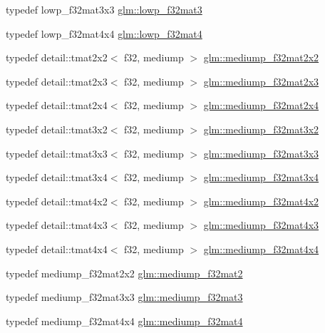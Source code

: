 \begin{DoxyCompactItemize}
\item 
typedef lowp\+\_\+f32mat3x3 \hyperlink{group__gtc__type__precision_ga84500ab23c0f0f3c585f8ad02f33b88c}{glm\+::lowp\+\_\+f32mat3}
\item 
typedef lowp\+\_\+f32mat4x4 \hyperlink{group__gtc__type__precision_gada4d11f44b410c1be7b6b1d05ccf692c}{glm\+::lowp\+\_\+f32mat4}
\item 
typedef detail\+::tmat2x2$<$ f32, mediump $>$ \hyperlink{group__gtc__type__precision_ga23c9239d6aa9b41c3d2145e2faa81edb}{glm\+::mediump\+\_\+f32mat2x2}
\item 
typedef detail\+::tmat2x3$<$ f32, mediump $>$ \hyperlink{group__gtc__type__precision_ga42497d19668931d225bccf1b9c614c19}{glm\+::mediump\+\_\+f32mat2x3}
\item 
typedef detail\+::tmat2x4$<$ f32, mediump $>$ \hyperlink{group__gtc__type__precision_ga20c5b3b715b70f1c09f7f95bfaa7aa84}{glm\+::mediump\+\_\+f32mat2x4}
\item 
typedef detail\+::tmat3x2$<$ f32, mediump $>$ \hyperlink{group__gtc__type__precision_ga9762d48bb9b41e3cf40f6e616cf61b6b}{glm\+::mediump\+\_\+f32mat3x2}
\item 
typedef detail\+::tmat3x3$<$ f32, mediump $>$ \hyperlink{group__gtc__type__precision_gad4d01189a1462366b143c5cbc3de0ea9}{glm\+::mediump\+\_\+f32mat3x3}
\item 
typedef detail\+::tmat3x4$<$ f32, mediump $>$ \hyperlink{group__gtc__type__precision_ga7ad59b967576d930f4c8aa7b8c48e1af}{glm\+::mediump\+\_\+f32mat3x4}
\item 
typedef detail\+::tmat4x2$<$ f32, mediump $>$ \hyperlink{group__gtc__type__precision_ga3400d5463f0a58cf3959406aa2b69f72}{glm\+::mediump\+\_\+f32mat4x2}
\item 
typedef detail\+::tmat4x3$<$ f32, mediump $>$ \hyperlink{group__gtc__type__precision_ga31635d753ab8a19fdaa80d2b89e90c54}{glm\+::mediump\+\_\+f32mat4x3}
\item 
typedef detail\+::tmat4x4$<$ f32, mediump $>$ \hyperlink{group__gtc__type__precision_ga8f83086fffe71f9cd15e75a1de101ba6}{glm\+::mediump\+\_\+f32mat4x4}
\item 
typedef mediump\+\_\+f32mat2x2 \hyperlink{group__gtc__type__precision_ga103735a38477f7c389b36aae0fbdf274}{glm\+::mediump\+\_\+f32mat2}
\item 
typedef mediump\+\_\+f32mat3x3 \hyperlink{group__gtc__type__precision_gae263a08ef179894fdd36f9a51698c4ab}{glm\+::mediump\+\_\+f32mat3}
\item 
typedef mediump\+\_\+f32mat4x4 \hyperlink{group__gtc__type__precision_ga56bd98ec31b6abc0315d688d4ecd94a0}{glm\+::mediump\+\_\+f32mat4}

\end{DoxyCompactItemize}
